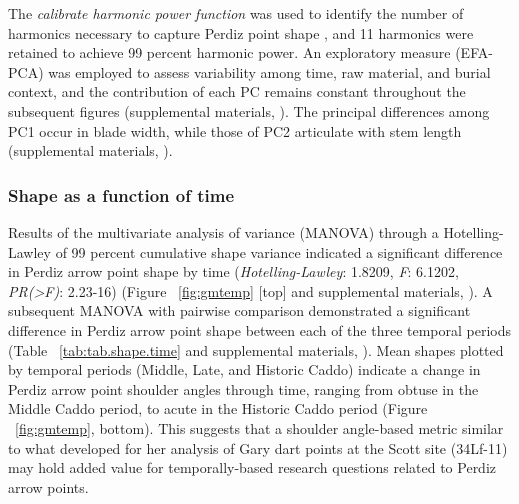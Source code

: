 \documentclass[review]{elsarticle}
\begin{document}
The \textit{calibrate harmonic power function} was used to identify the number of harmonics necessary to capture Perdiz point shape \citep{RN8925}, and 11 harmonics were retained to achieve 99 percent harmonic power. An exploratory measure (EFA-PCA) was employed to assess variability among time, raw material, and burial context, and the contribution of each PC remains constant throughout the subsequent figures  (supplemental materials, \citealt[Chapter 4]{RN8980}). The principal differences among PC1 occur in blade width, while those of PC2 articulate with stem length (supplemental materials, \citealt[Chapter 4]{RN8980}).

\subsubsection*{Shape as a function of time}

Results of the multivariate analysis of variance (MANOVA) through a Hotelling-Lawley of 99 percent cumulative shape variance indicated a significant difference in Perdiz arrow point shape by time (\textit{Hotelling-Lawley}: 1.8209, \textit{F}: 6.1202, \textit{PR(>F)}: 2.23-16) (Figure ~\ref{fig:gmtemp} [top] and supplemental materials, \citealt[Chapter 4]{RN8980}). A subsequent MANOVA with pairwise comparison demonstrated a significant difference in Perdiz arrow point shape between each of the three temporal periods (Table ~\ref{tab:tab.shape.time} and supplemental materials, \citealt[Chapter 4]{RN8980}). Mean shapes plotted by temporal periods (Middle, Late, and Historic Caddo) indicate a change in Perdiz arrow point shoulder angles through time, ranging from obtuse in the Middle Caddo period, to acute in the Historic Caddo period (Figure ~\ref{fig:gmtemp}, bottom). This suggests that a shoulder angle-based metric similar to what \citet{RN8275} developed for her analysis of Gary dart points at the Scott site (34Lf-11) may hold added value for temporally-based research questions related to Perdiz arrow points.
\end{document}
